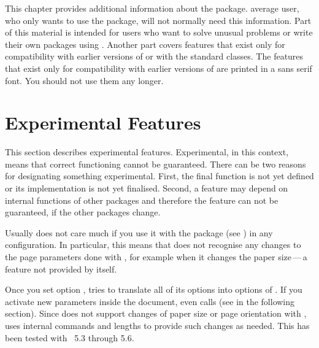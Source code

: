 This chapter provides additional information about the 
package.  average user, who only wants to use the package, will not
normally need this information. Part of this material is intended for users
who want to solve unusual problems or write their own packages using
. Another part covers  features that exist
only for compatibility with earlier versions of \KOMAScript{} or with the
standard classes. The features that exist only for compatibility with earlier
versions of \KOMAScript{} are printed in a sans serif font. You should not use
them any longer.


\section{Experimental Features}

This section describes experimental features. Experimental, in this context,
means that correct functioning cannot be guaranteed. There can be two reasons
for designating something experimental. First, the final function is not yet
defined or its implementation is not yet finalised. Second, a feature may
depend on internal functions of other packages and therefore the feature can
not be guaranteed, if the other packages change.

\begin{Declaration}
\end{Declaration}
Usually  does not care much if you use it with the
 package (see
\cite{package:geometry}) in any configuration. In particular, this means that
 does not recognise any changes to the page parameters done
with , for example when it changes the paper size\,---\,a
feature not provided by  itself.

Once you set option ,
 tries to translate all of its options into options of
. If you activate new parameters inside the document,
 even calls  (see
 in the following section). Since
 does not support changes of paper size or page orientation
with ,  uses internal commands and
 lengths to provide such changes as needed. This has been
tested with ~5.3 through 5.6.

